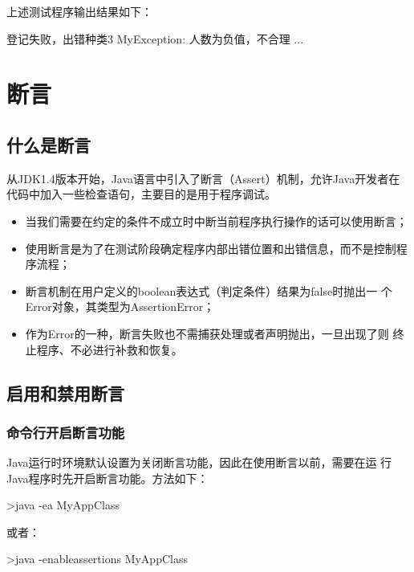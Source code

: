 上述测试程序输出结果如下：

\begin{stdoutCode}
登记失败，出错种类3
MyException: 人数为负值，不合理 ...
\end{stdoutCode}

\section{断言}

\subsection{什么是断言}

从JDK1.4版本开始，Java语言中引入了断言（Assert）机制，允许Java开发者在
代码中加入一些检查语句，主要目的是用于程序调试。

\begin{itemize}
\item 当我们需要在约定的条件不成立时中断当前程序执行操作的话可以使用断言；
\item 使用断言是为了在测试阶段确定程序内部出错位置和出错信息，而不是控制程序流程；
\item 断言机制在用户定义的boolean表达式（判定条件）结果为false时抛出一
  个Error对象，其类型为AssertionError；
\item 作为Error的一种，断言失败也不需捕获处理或者声明抛出，一旦出现了则
  终止程序、不必进行补救和恢复。

\end{itemize}

\subsection{启用和禁用断言}

\subsubsection{命令行开启断言功能}

Java运行时环境默认设置为关闭断言功能，因此在使用断言以前，需要在运
行Java程序时先开启断言功能。方法如下：

\begin{shCode}
>java -ea MyAppClass
\end{shCode}

或者：

\begin{shCode}
>java -enableassertions MyAppClass  
\end{shCode}

